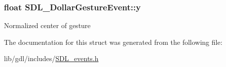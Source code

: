 \subsubsection[{y}]{\setlength{\rightskip}{0pt plus 5cm}float S\+D\+L\+\_\+\+Dollar\+Gesture\+Event\+::y}\label{struct_s_d_l___dollar_gesture_event_a293b2303acc1cfc63c167c5525e6eab5}
Normalized center of gesture 

The documentation for this struct was generated from the following file\+:\begin{DoxyCompactItemize}
\item 
lib/gdl/includes/\hyperlink{_s_d_l__events_8h}{S\+D\+L\+\_\+events.\+h}\end{DoxyCompactItemize}
